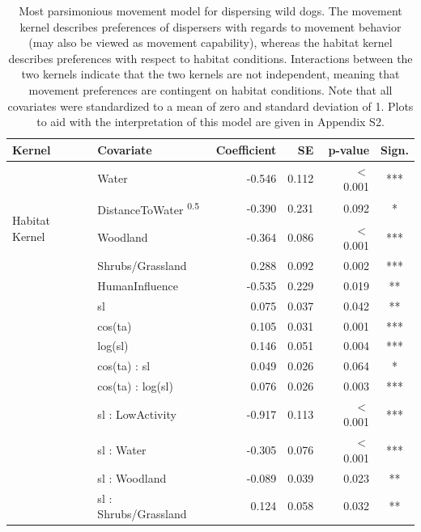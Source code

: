 \documentclass[abstract=on,10pt,a4paper,bibliography=totocnumbered]{article}
\begin{document}
\begin{table}
  \begin{center}
  \caption{Most parsimonious movement model for dispersing wild dogs. The
  movement kernel describes preferences of dispersers with regards to movement
  behavior (may also be viewed as movement capability), whereas the habitat
  kernel describes preferences with respect to habitat conditions. Interactions
  between the two kernels indicate that the two kernels are not independent,
  meaning that movement preferences are contingent on habitat conditions. Note
  that all covariates were standardized to a mean of zero and standard deviation
  of 1. Plots to aid with the interpretation of this model are given in Appendix
  S2.}
  \label{MovementModelNumbers}
  \resizebox{\textwidth}{!} {
    \begin{threeparttable}
      \begin{tabular}{llrrrc}
        \toprule
        Kernel & Covariate & Coefficient & SE & p-value & Sign. \\
        \midrule
        \multirow{5}{*}{Habitat Kernel}
         & Water & -0.546 & 0.112 & \(<\) 0.001 & *** \\
         & DistanceToWater \textsuperscript{0.5} & -0.390 & 0.231 & 0.092 & * \\
         & Woodland & -0.364 & 0.086 & \(<\) 0.001 & *** \\
         & Shrubs/Grassland & 0.288 & 0.092 & 0.002 & *** \\
         & HumanInfluence & -0.535 & 0.229 & 0.019 & ** \\
        \hdashline
        \multirow{6}{*}{Movement Kernel}
         & sl & 0.075 & 0.037 & 0.042 & ** \\
         & cos(ta) & 0.105 & 0.031 & 0.001 & *** \\
         & log(sl) & 0.146 & 0.051 & 0.004 & *** \\
         & cos(ta) : sl & 0.049 & 0.026 & 0.064 & * \\
         & cos(ta) : log(sl) & 0.076 & 0.026 & 0.003 & *** \\
         & sl : LowActivity & -0.917 & 0.113 & \(<\) 0.001 & *** \\
        \hdashline
        \multirow{5}{*}{Interactions}
         & sl : Water & -0.305 & 0.076 & \(<\) 0.001 & *** \\
         & sl : Woodland & -0.089 & 0.039 & 0.023 & ** \\
         & sl : Shrubs/Grassland & 0.124 & 0.058 & 0.032 & ** \\

\end{tabular}
\end{threeparttable}}
\end{center}
\end{table}
\end{document}
